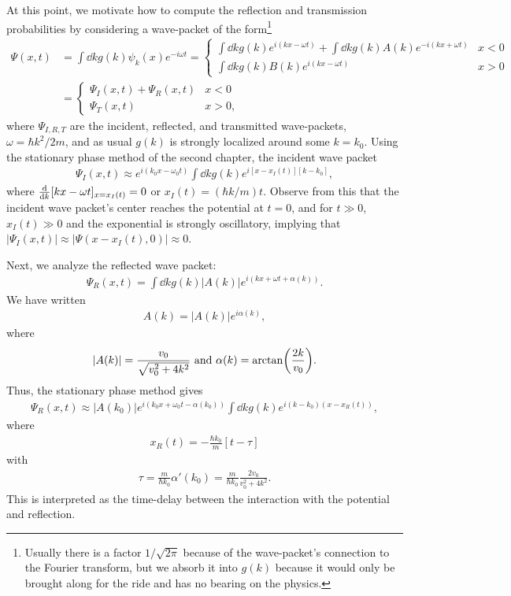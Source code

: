 At this point, we motivate how to compute the reflection and transmission probabilities by considering a wave-packet of the form\footnote{Usually there is a factor $1/\sqrt{2\pi}$ because of the wave-packet's connection to the Fourier transform, but we absorb it into $g(k)$ because it would only be brought along for the ride and has no bearing on the physics.}
\begin{align}
    \Psi(x,t) &= \int \dd{k} g(k) \psi_{k}(x) e^{-i\omega t} = \begin{cases}
        \int \dd{k} g(k) e^{i(kx - \omega t)} + \int \dd{k} g(k) A(k) e^{-i(kx + \omega t)} & x < 0 \\
        \int \dd{k} g(k) B(k) e^{i(kx - \omega t)} & x > 0
    \end{cases} \nonumber \\
    &= \begin{cases}
        \Psi_{I}(x,t) + \Psi_{R}(x,t) & x < 0 \\
        \Psi_{T}(x,t) & x > 0
    ,\end{cases}
\end{align}
where $\Psi_{I,R,T}$ are the incident, reflected, and transmitted wave-packets, $\omega = \hbar k^2/2m$, and as usual $g(k)$ is strongly localized around some $k = k_0$.
Using the stationary phase method of the second chapter, the incident wave packet
\begin{eqnarray}
    \Psi_{I}(x,t) \approx e^{i(k_0 x - \omega_0 t)} \int \dd{k} g(k) e^{i[x - x_{I}(t)][k - k_0]}
,\end{eqnarray}
where $\dv{k} [kx - \omega t]_{x = x_{I}(t)} = 0$ or $x_{I}(t) = (\hbar k / m) t$.
Observe from this that the incident wave packet's center reaches the potential at $t = 0$, and for $t \gg 0$, $x_{I}(t) \gg 0$ and the exponential is strongly oscillatory, implying that $|\Psi_{I}(x,t)| \approx |\Psi(x - x_{I}(t),0)| \approx 0$.

Next, we analyze the reflected wave packet:
\begin{eqnarray}
    \Psi_{R}(x,t) = \int \dd{k} g(k) |A(k)| e^{i(kx + \omega t + \alpha(k))}
.\end{eqnarray}
We have written
\begin{eqnarray}
    A(k) = |A(k)|e^{i\alpha(k)}
,\end{eqnarray}
where
\begin{eqnarray}
    |A(k)| = \frac{v_0}{\sqrt{ v_0^2 + 4 k^2 }} ~{\rm and}~ \alpha(k) = \arctan( \frac{2k}{v_0} )
.\end{eqnarray}
Thus, the stationary phase method gives
\begin{eqnarray}
    \Psi_{R}(x,t) \approx |A(k_0)| e^{i(k_0 x + \omega_0 t - \alpha(k_0))} \int \dd{k} g(k) e^{i(k - k_0)(x - x_{R}(t))}
,\end{eqnarray}
where
\begin{eqnarray}
    x_{R}(t) = - \frac{\hbar k_0}{m} [t - \tau]
\end{eqnarray}
with
\begin{eqnarray}
    \tau = \frac{m}{\hbar k_0} \alpha'(k_0) = \frac{m}{\hbar k_0} \frac{2 v_0}{v_0^2 + 4k^2}
.\end{eqnarray}
This is interpreted as the time-delay between the interaction with the potential and reflection.

